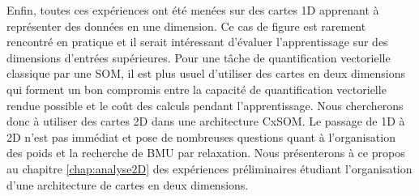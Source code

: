 \documentclass[../main]{subfiles}
\begin{document}
Enfin, toutes ces expériences ont été menées sur des cartes 1D apprenant à représenter des données en une dimension. Ce cas de figure est rarement rencontré en pratique et il serait intéressant d'évaluer l'apprentissage sur des dimensions d'entrées supérieures. Pour une tâche de quantification vectorielle classique par une SOM, il est plus usuel d'utiliser des cartes en deux dimensions qui forment un bon compromis entre la capacité de quantification vectorielle rendue possible et le coût des calculs pendant l'apprentissage. Nous chercherons donc à utiliser des cartes 2D dans une architecture CxSOM. Le passage de 1D à 2D n'est pas immédiat et pose de nombreuses questions quant à l'organisation des poids et la recherche de BMU par relaxation. 
Nous présenterons à ce propos au chapitre \ref{chap:analyse2D} des expériences préliminaires étudiant l'organisation d'une architecture de cartes en deux dimensions.

\ifSubfilesClassLoaded{
    \printbibliography
}{}
\end{document}
